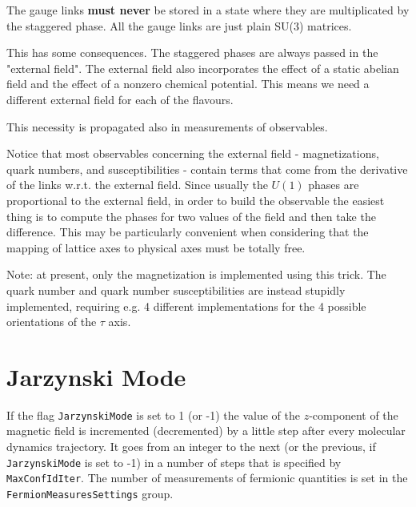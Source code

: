 The gauge links {\bfseries must never} be stored in a state where they
are multiplicated by the staggered phase. All the gauge links are just
plain SU(3) matrices.

This has some consequences. The staggered phases are always passed in the "external field".
The external field also incorporates the effect of a static abelian
field and the effect of a nonzero chemical potential.
This means we need a different external field for each of the
flavours.

This necessity is propagated also in measurements of observables.

Notice that most observables concerning the external field - magnetizations, 
quark numbers, and susceptibilities - contain terms that come from the derivative 
of the links w.r.t. the external field. Since usually the $U(1)$ phases are proportional 
to the external field, in order to build the observable the easiest thing is to 
compute the phases for two values of the field and then take the difference.
This may be particularly convenient when considering that the mapping of lattice axes to physical axes 
must be totally free.

Note: at present, only the magnetization is implemented using this trick. The 
quark number and quark number susceptibilities are instead stupidly implemented, requiring e.g. 4 different 
implementations for the 4 possible orientations of the $\tau$ axis.

\section{Jarzynski Mode}
\label{JarzynskiMode}

If the flag \verb|JarzynskiMode| is set to 1 (or -1) the value of the $z$-component of the magnetic field is incremented (decremented)
by a little step after every molecular dynamics trajectory. It goes from an integer to the next (or the previous, if \verb|JarzynskiMode| is set to -1)
in a number of steps that is specified by \verb|MaxConfIdIter|. 
The number of measurements of fermionic quantities is set in the \verb|FermionMeasuresSettings| group.


